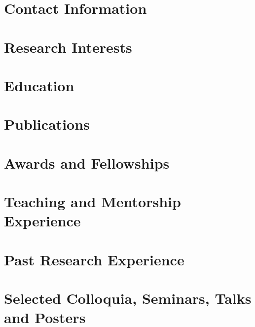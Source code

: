 \documentclass[margin,line]{res}
\begin{document}
\centerline{\LARGE {}}
\bigskip


\begin{resume}
\section{\sc Contact Information}
    
\section{\sc Research Interests}
    
\section{\sc Education}
    
\section{\sc Publications}
    
\section{\sc Awards and Fellowships}
    
\section{\sc Teaching and Mentorship Experience}
    
\section{\sc Past Research Experience}
    
\section{\sc Selected Colloquia, Seminars, Talks and Posters}
    
%     
%     

\end{resume}
\end{document}
